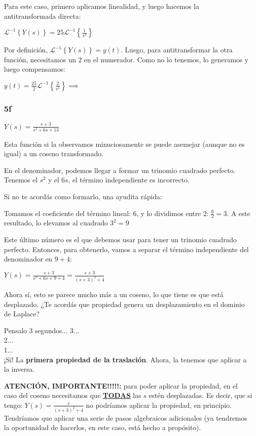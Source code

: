 \documentclass[11pt]{article}
\newcommand{\ilapl}[1]{\mathscr{L}^{-1} \left\lbrace {#1} \right\rbrace}
\begin{document}
	Para este caso, primero aplicamos linealidad, y luego hacemos la antitransformada directa:
	
	$\displaystyle \ilapl{Y(s)}=25\ilapl{\frac{1}{s^{3}}}$
	
	Por definición, $\ilapl{Y(s)}=y(t)$. Luego, para antitransformar la otra función, necesitamos un $2$ en el numerador. Como no lo tenemos, lo generamos y luego compensamos:
	
	$\displaystyle y(t)=\frac{25}{2}\ilapl{\frac{2}{s^{3}}} \implies$ 
	
	\subsubsection{5f}
	$\displaystyle Y(s)=\frac{s+3}{s^{2}+6s+13}$
	
	Esta función si la observamos minuciosamente se puede asemejar (aunque no es igual) a un coseno transformado.
	
	En el denominador, podemos llegar a formar un trinomio cuadrado perfecto. Tenemos el $s^{2}$ y el $6s$, el término independiente es incorrecto.
	
	Si no te acordás como formarlo, una ayudita rápida:
	
	Tomamos el coeficiente del término lineal: $6$, y lo dividimos entre $2$: $\frac{6}{2}=3$. A este resultado, lo elevamos al cuadrado $3^{2}=\boxed{9}$
	
	Este último número es el que debemos usar para tener un trinomio cuadrado perfecto. Entonces, para obtenerlo, vamos a separar el término independiente del denominador en $9+4$:
	
	$\displaystyle Y(s)=\frac{s+3}{s^{2}+6s+9+4}=\frac{s+3}{(s+3)^{2}+4}$
	
	Ahora sí, esto se parece mucho más a un coseno, lo que tiene es que está desplazado. ¿Te acordás que propiedad genera un desplazamiento en el dominio de Laplace?
	
	Pensalo 3 segundos...
	3...\\
	2...\\
	1...\\
	
	¡Si! La \textbf{primera propiedad de la traslación}. Ahora, la tenemos que aplicar a la inversa.
	
	\textbf{ATENCIÓN, IMPORTANTE!!!!!:} para poder aplicar la propiedad, en el caso del coseno necesitamos que \textbf{\underline{TODAS}} las $s$ estén desplazadas. Es decir, que si tengo: $\displaystyle Y(s)=\frac{s}{(s+3)^{2}+4}$ no podríamos aplicar la propiedad, en principio. Tendríamos que aplicar una serie de pasos algebraicos adicionales (ya tendremos la oportunidad de hacerlos, en este caso, está hecho a propósito).
	
\end{document}
